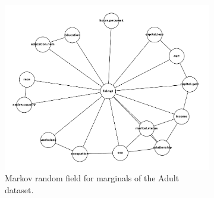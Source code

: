 \documentclass[manuscript,screen,review,anonymous]{acmart}
\begin{document}


\begin{figure}
  \centering
  \begin{subfigure}[b]{0.3\textwidth}
      \centering
      \includegraphics[width=\textwidth]{adult_mst}
      \caption{Markov random field for marginals of the Adult dataset.}
      \label{fig:adult_mst}
  \end{subfigure}
  \hfill
  \begin{subfigure}[b]{0.3\textwidth}
      \centering

\end{subfigure}
\end{figure}
\end{document}
